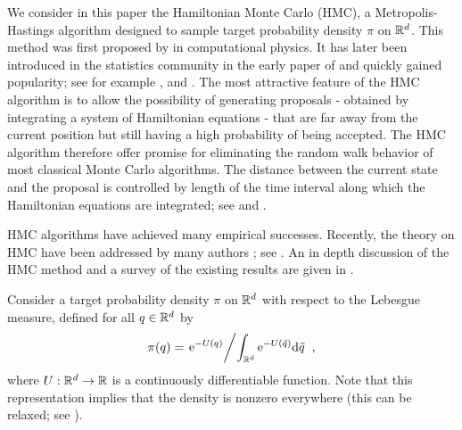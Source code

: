 
We consider in this paper the Hamiltonian Monte
Carlo (HMC),  a Metropolis-Hastings
algorithm designed to sample  target probability density
$\pi$ on $\mathbb{R}^d$. This method was first proposed by \cite{duane:1987}  in computational physics. It has later been introduced in the  statistics community in the early paper of \cite{neal:1993} and quickly  gained popularity; see for example \cite[chapter~9]{liu:2008}, \cite{neal:2011} and \cite{girolami:calderhead:2011}. The most attractive feature of the HMC algorithm is to allow the possibility of generating proposals -  obtained by integrating a system of Hamiltonian equations - that are far away from the current position but still having a high probability of being accepted. The HMC algorithm therefore offer promise for eliminating the random walk behavior of most classical Monte Carlo algorithms. The distance between the current state and the proposal is controlled by length of the time interval along which the Hamiltonian equations are integrated; see \cite[chapter~9]{liu:2008} and \cite{sanz-serna:2014}.

HMC algorithms have achieved many empirical successes. Recently, the theory on HMC have been addressed by many authors %
; see
\cite{byrne:girolami:2013,tang:srivastava:salakhutdinov:2014,
schofield:barker:gelman:cook:briffa:2016,betancourt-bernoulli:2017,livingstone:betancourt:byrne:girolami:2016}. An in depth discussion of the HMC method and a survey of the existing results are given in \cite{bou-rabee:sanz-serna:2018}.

Consider a target probability density  $\pi$ on $\mathbb{R}^d$ with respect to the Lebesgue measure,  defined for all $q \in \mathbb{R}^d$ by
\begin{equation}
\label{eq:def_density_pi}
\pi(q) = \left. \mathrm{e}^{-U(q)} \middle / \int_{\mathbb{R}^d}\mathrm{e}^{-U(\tilde{q})} \mathrm{d} \tilde{q} \right.\;,
\end{equation}
where $U: \mathbb{R}^d \to
\mathbb{R}$ is a continuously differentiable function. Note that this representation implies that the density is nonzero everywhere (this can be relaxed; see \cite[Section~5.5.1]{neal:2011}).

